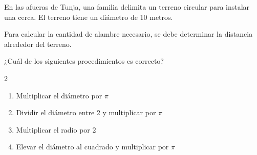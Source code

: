 En las afueras de Tunja, una familia delimita un terreno circular para instalar una cerca. El terreno tiene un diámetro de 10 metros.

Para calcular la cantidad de alambre necesario, se debe determinar la distancia alrededor del terreno.

¿Cuál de los siguientes procedimientos es correcto?

\begin{multicols}{2}
\begin{enumerate}[label=\alph*), leftmargin=*]
\item Multiplicar el diámetro por $\pi$
\item Dividir el diámetro entre 2 y multiplicar por $\pi$
\item Multiplicar el radio por 2
\item Elevar el diámetro al cuadrado y multiplicar por $\pi$
\end{enumerate}
\end{multicols}